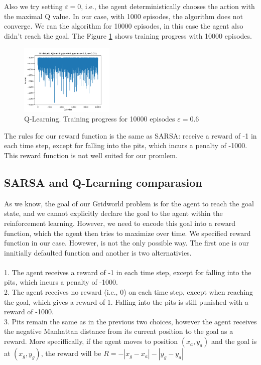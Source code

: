 \documentclass[a4paper, twoside, english]{article}
\begin{document}
Also we try setting $\varepsilon=0$, i.e., the agent deterministically chooses the action with the maximal Q value. In our case, with 1000 episodes, the algorithm does not converge. We ran the algorithm for 10000 episodes, in this case the agent also didn't reach the goal. The Figure \ref{fig:Q_Learn1_10000} shows training progress with 10000 episodes.\\
\begin{figure}[h!]
	\centerline{\includegraphics[width=0.40\textwidth]{Qlearn_R1_10000.png}}
	\caption[null]{Q-Learning. Training progress for 10000 episodes $\varepsilon=0.6$}
	\label{fig:Q_Learn1_10000}
\end{figure}

The rules for our reward function is the same as SARSA: receive a reward of -1 in each time step, except for falling into the pits, which incurs a penalty of -1000. This reward function is not well suited for our promlem.\\

\newpage

\subsection{SARSA and Q-Learning comparasion}
As we know, the goal of our Gridworld problem is for the agent to reach the goal state, and we cannot explicitly declare the goal to the agent within the reinforcement learning. However, we need to encode this goal into a reward function, which the agent then tries to maximize over time. We specified reward function in our case. Howewer, is not the only possible way. The first one is our innitially defaulted function and another is two alternativies.\\
~\\
1. The agent receives a reward of -1 in each time step, except for falling into the pits, which incurs a penalty of -1000.\\
2. The agent receives no reward (i.e., 0) on each time step, except when reaching the goal, which gives a reward of 1. Falling into the pits is still punished with a reward of -1000.\\
3. Pits remain the same as in the previous two choices, however the agent receives the negative Manhattan distance from its current position to the goal as a reward. More speciffically, if the agent moves to position $(x_a, y_a)$ and the goal is at $(x_g, y_g)$, the reward will be $R=-|x_g-x_a|-|y_g-y_a|$\\
~\\
\end{document}
